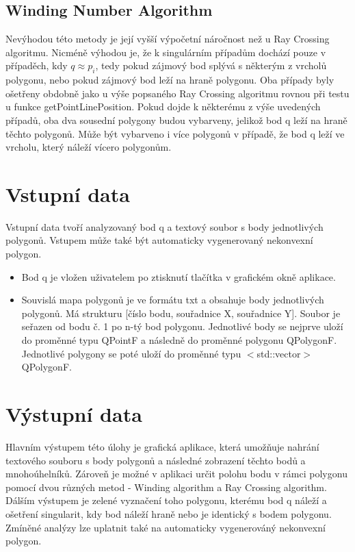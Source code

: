 \documentclass[a4paper,11pt,twoside]{article}
\begin{document}
\subsection{Winding Number Algorithm}
\large
Nevýhodou této metody je její vyšší výpočetní náročnost než u Ray Crossing algoritmu. Nicméně výhodou je, že k singulárním případům dochází pouze v případěch, kdy $q \approx p_i$, tedy pokud zájmový bod splývá s některým z vrcholů polygonu, nebo pokud zájmový bod leží na hraně polygonu. Oba případy byly ošetřeny obdobně jako u výše popsaného Ray Crossing algoritmu rovnou při testu u funkce getPointLinePosition. Pokud dojde k některému z výše uvedených případů, oba dva sousední polygony budou vybarveny, jelikož bod q leží na hraně těchto polygonů. Může být vybarveno i více polygonů v případě, že bod q leží ve vrcholu, který náleží vícero polygonům.

\newpage
{}

\vspace*{-1cm}
\section{Vstupní data}
Vstupní data tvoří analyzovaný bod q a textový soubor s body jednotlivých polygonů. Vstupem může také být automaticky vygenerovaný nekonvexní polygon.
\begin{itemize}
\item Bod q je vložen uživatelem po ztisknutí tlačítka v grafickém okně aplikace.
\item Souvislá mapa polygonů je ve formátu txt a obsahuje body jednotlivých polygonů. Má strukturu
[číslo bodu, souřadnice X, souřadnice Y]. Soubor je seřazen od bodu č. 1 po n-tý bod polygonu. Jednotlivé body se nejprve uloží do proměnné typu QPointF a následně do proměnné polygonu QPolygonF. Jednotlivé polygony se poté uloží do proměnné typu $<$std::vector$>$QPolygonF.
\end{itemize}

\section{Výstupní data}
Hlavním výstupem této úlohy je grafická aplikace, která umožňuje nahrání textového souboru s body polygonů a následné zobrazení těchto bodů a mnohoúhelníků. Zároveň je možné v aplikaci určit polohu bodu v rámci polygonu pomocí dvou různých metod - Winding algorithm a Ray Crossing algorithm. Dálším výstupem je zelené vyznačení toho polygonu, kterému bod q náleží a ošetření singularit, kdy bod náleží hraně nebo je identický s bodem polygonu. Zmíněné analýzy lze uplatnit také na automaticky vygenerováný nekonvexní polygon.
\\
\end{document}
